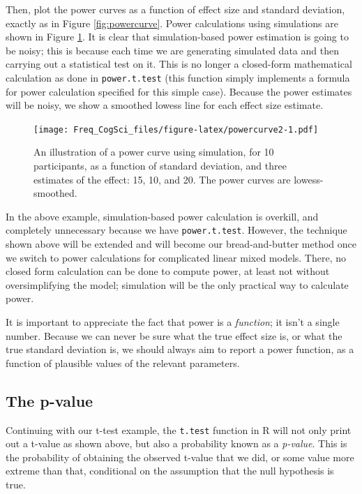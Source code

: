 \documentclass[12pt,]{krantz}
\begin{document}
Then, plot the power curves as a function of effect size and standard deviation, exactly as in Figure \ref{fig:powercurve}. Power calculations using simulations are shown in Figure \ref{fig:powercurve2}. It is clear that simulation-based power estimation is going to be noisy; this is because each time we are generating simulated data and then carrying out a statistical test on it. This is no longer a closed-form mathematical calculation as done in \texttt{power.t.test} (this function simply implements a formula for power calculation specified for this simple case). Because the power estimates will be noisy, we show a smoothed lowess line for each effect size estimate.

\begin{figure}
\centering
\texttt{[image: Freq\_CogSci\_files/figure-latex/powercurve2-1.pdf]}
\caption{\label{fig:powercurve2}An illustration of a power curve using simulation, for 10 participants, as a function of standard deviation, and three estimates of the effect: 15, 10, and 20. The power curves are lowess-smoothed.}
\end{figure}

In the above example, simulation-based power calculation is overkill, and completely unnecessary because we have \texttt{power.t.test}. However, the technique shown above will be extended and will become our bread-and-butter method once we switch to power calculations for complicated linear mixed models. There, no closed form calculation can be done to compute power, at least not without oversimplifying the model; simulation will be the only practical way to calculate power.

It is important to appreciate the fact that power is a \emph{function}; it isn't a single number. Because we can never be sure what the true effect size is, or what the true standard deviation is, we should always aim to report a power function, as a function of plausible values of the relevant parameters.

\hypertarget{the-p-value}{%
\subsection{The p-value}\label{the-p-value}}

Continuing with our t-test example, the \texttt{t.test} function in R will not only print out a t-value as shown above, but also a probability known as a \emph{p-value}. This is the probability of obtaining the observed t-value that we did, or some value more extreme than that, conditional on the assumption that the null hypothesis is true.
\end{document}
